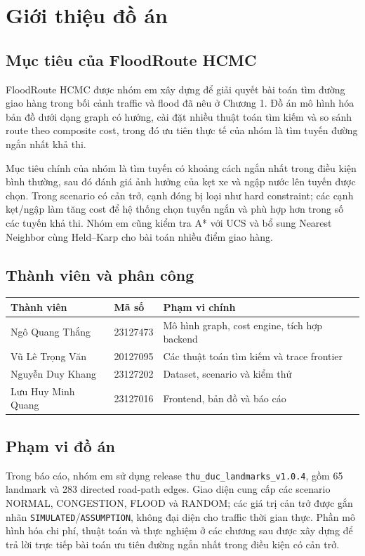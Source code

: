 \section{Giới thiệu đồ án}
\subsection{Mục tiêu của FloodRoute HCMC}
FloodRoute HCMC được nhóm em xây dựng để giải quyết bài toán tìm đường giao hàng trong bối cảnh traffic và flood đã nêu ở Chương 1. Đồ án mô hình hóa bản đồ dưới dạng graph có hướng, cài đặt nhiều thuật toán tìm kiếm và so sánh route theo composite cost, trong đó ưu tiên thực tế của nhóm là tìm tuyến đường ngắn nhất khả thi.

Mục tiêu chính của nhóm là tìm tuyến có khoảng cách ngắn nhất trong điều kiện bình thường, sau đó đánh giá ảnh hưởng của kẹt xe và ngập nước lên tuyến được chọn. Trong scenario có cản trở, cạnh đóng bị loại như hard constraint; các cạnh kẹt/ngập làm tăng cost để hệ thống chọn tuyến ngắn và phù hợp hơn trong số các tuyến khả thi. Nhóm em cũng kiểm tra A* với UCS và bổ sung Nearest Neighbor cùng Held--Karp cho bài toán nhiều điểm giao hàng.

\subsection{Thành viên và phân công}
\begin{tabularx}{\textwidth}{l l X}
\toprule
Thành viên & Mã số & Phạm vi chính\\
\midrule
Ngô Quang Thắng & 23127473 & Mô hình graph, cost engine, tích hợp backend\\
Vũ Lê Trọng Văn & 20127095 & Các thuật toán tìm kiếm và trace frontier\\
Nguyễn Duy Khang & 23127202 & Dataset, scenario và kiểm thử\\
Lưu Huy Minh Quang & 23127016 & Frontend, bản đồ và báo cáo\\
\bottomrule
\end{tabularx}

\subsection{Phạm vi đồ án}
Trong báo cáo, nhóm em sử dụng release \texttt{thu\_duc\_landmarks\_v1.0.4}, gồm 65 landmark và 283 directed road-path edges. Giao diện cung cấp các scenario NORMAL, CONGESTION, FLOOD và RANDOM; các giá trị cản trở được gắn nhãn \texttt{SIMULATED}/\texttt{ASSUMPTION}, không đại diện cho traffic thời gian thực. Phần mô hình hóa chi phí, thuật toán và thực nghiệm ở các chương sau được xây dựng để trả lời trực tiếp bài toán ưu tiên đường ngắn nhất trong điều kiện có cản trở.
